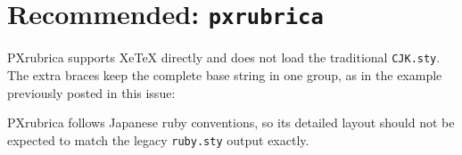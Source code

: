 \documentclass{article}
\begin{document}
\section*{Recommended: \texttt{pxrubrica}}

PXrubrica supports XeTeX directly and does not load the traditional
\texttt{CJK.sty}.  The extra braces keep the complete base string in one
group, as in the example previously posted in this issue:

\begin{center}
\end{center}

PXrubrica follows Japanese ruby conventions, so its detailed layout should
not be expected to match the legacy \texttt{ruby.sty} output exactly.
\end{document}
